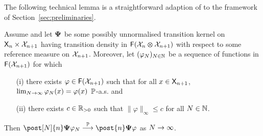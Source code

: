 The following technical lemma is a straightforward adaption of \cite[Lemma~14]{olsson:westerborn:2014b} to the framework of Section~\ref{sec:preliminaries}. 

\begin{lemma}
\label{lem:generalized:lebesgue}
Assume  and let $\mathbf{\Psi}$ be some possibly unnormalised transition kernel on $\mathsf{X}_n \times \mathcal{X}_{n + 1}$ having transition density in $\mathsf{F}(\mathcal{X}_n \varotimes \mathcal{X}_{n + 1})$ with respect to some reference measure on $\mathcal{X}_{n + 1}$. Moreover, let $(\varphi_N)_{N \in \mathbb{N}}$ be a sequence of functions in $\mathsf{F}(\mathcal{X}_{n + 1})$  for which 
\begin{itemize}
\item[(i)] there exists $\varphi \in \mathsf{F}(\mathcal{X}_{n + 1})$ such that for all $x \in \mathsf{X}_{n + 1}$, $\lim_{N \to \infty} \varphi_N(x) = \varphi(x)$ $\mathbb{P}$-a.s. and 
\item[(ii)] there exists $c \in \mathbb{R}_{> 0}$ such that $\|\varphi \|_\infty \leq c$ for all $N \in \mathbb{N}$. 
\end{itemize} 
Then $\post[\N]{n} \kernel{\Psi} \varphi_\N \pplim \post{n} \kernel{\Psi} \varphi$ as $N \to \infty$. 
\end{lemma}
